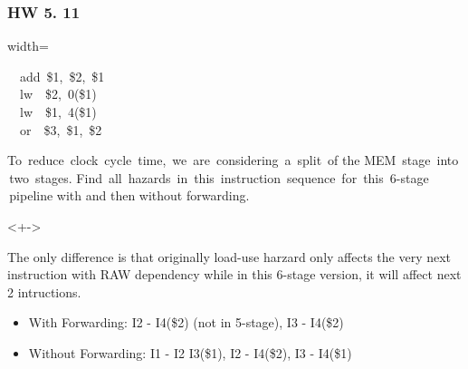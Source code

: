 \documentclass[xcolor=table]{beamer}
\begin{document}
\begin{mdframe}%

\frametitle{HW 5. 11}\label{heading-sec-hw-5-11}%

\begin{mdblock}{width=}%
\begin{mdpre}%
\noindent~~{add}~\$1,~\$2,~\$1\\
~~{lw}~~\$2,~{0}(\$1)\\
~~{lw}~~\$1,~{4}(\$1)\\
~~{or}~~\$3,~\$1,~\$2%
\end{mdpre}%
\end{mdblock}%

\noindent{} To  reduce  clock  cycle  time,  we  are  considering  a  split  of the MEM  stage  into  two  stages. Find  all  hazards  in  this  instruction  sequence  for  this  6-stage  pipeline with and then without forwarding.%

\mdhr{}%

\begin{onlyenv}<+->%

\noindent{}The only difference is that originally load-use harzard only affects the very next instruction with RAW dependency while in this 6-stage version, it will affect next 2 intructions.%

\begin{itemize}[noitemsep,topsep=\mdcompacttopsep]%

\item{}With Forwarding: I2 - I4(\$2) (not in 5-stage), I3 - I4(\$2)%

\item{}Without Forwarding: I1 - I2 I3(\$1), I2 - I4(\$2), I3 - I4(\$1)%
\end{itemize}%
\end{onlyenv}%
\end{mdframe}\label{sec-hw-5-11}%
\end{document}

